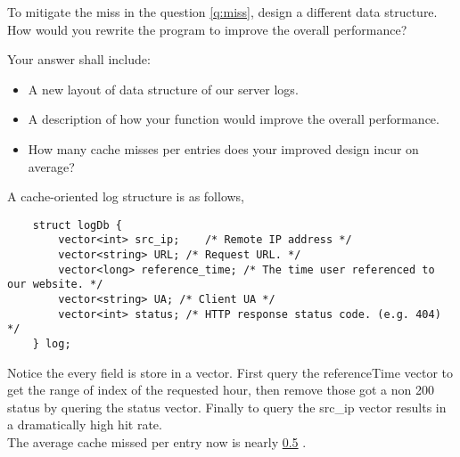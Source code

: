 \begin{questions}
\newpage

\question[6] To mitigate the miss in the question \ref{q:miss},
design a different data structure. How would you rewrite the
program to improve the overall performance?

Your answer shall include:

\begin{itemize}
    \item A new layout of data structure of our server logs.
    \item A description of how your function would improve the
    overall performance.
    \item How many cache misses per entries does your improved
    design incur on average?
\end{itemize}

{
    \begin{solution}
        A cache-oriented log structure is as follows,
\begin{verbatim}
    struct logDb {
        vector<int> src_ip;    /* Remote IP address */
        vector<string> URL; /* Request URL. */
        vector<long> reference_time; /* The time user referenced to our website. */
        vector<string> UA; /* Client UA */
        vector<int> status; /* HTTP response status code. (e.g. 404) */
    } log;
\end{verbatim}
    Notice the every field is store in a vector. First query the referenceTime vector to get the range of index of the requested hour, then remove those got a non 200 status by quering the status vector. Finally to query the src\_ip vector results in a dramatically high hit rate.\\
    The average cache missed per entry now is nearly \uline{0.5} .
        \vspace{4in}
    \end{solution}
}

\end{questions}